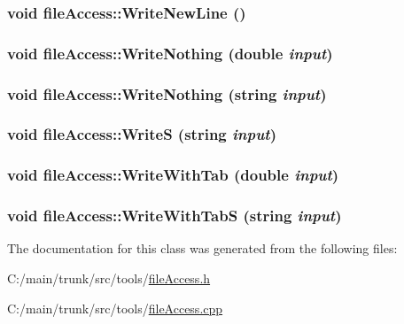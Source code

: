 \label{classfile_access_ab759f81ea15751aab3aa7ffc1bcb6162}
\hypertarget{classfile_access_a2c7465a2729dacc84a3701e997ffb320}{
\subsubsection[{WriteNewLine}]{\setlength{\rightskip}{0pt plus 5cm}void fileAccess::WriteNewLine ()}}
\label{classfile_access_a2c7465a2729dacc84a3701e997ffb320}
\hypertarget{classfile_access_ab555c3549e0c4ee285a4f4b8c8867e4c}{
\subsubsection[{WriteNothing}]{\setlength{\rightskip}{0pt plus 5cm}void fileAccess::WriteNothing (double {\em input})}}
\label{classfile_access_ab555c3549e0c4ee285a4f4b8c8867e4c}
\hypertarget{classfile_access_ac4de08bd121eadb157f295550c74dd99}{
\subsubsection[{WriteNothing}]{\setlength{\rightskip}{0pt plus 5cm}void fileAccess::WriteNothing (string {\em input})}}
\label{classfile_access_ac4de08bd121eadb157f295550c74dd99}
\hypertarget{classfile_access_a26ef28c6d48e3f4a88bd0197c6abeec0}{
\subsubsection[{WriteS}]{\setlength{\rightskip}{0pt plus 5cm}void fileAccess::WriteS (string {\em input})}}
\label{classfile_access_a26ef28c6d48e3f4a88bd0197c6abeec0}
\hypertarget{classfile_access_a833e66cca1f4d94b7f9250333d198c75}{
\subsubsection[{WriteWithTab}]{\setlength{\rightskip}{0pt plus 5cm}void fileAccess::WriteWithTab (double {\em input})}}
\label{classfile_access_a833e66cca1f4d94b7f9250333d198c75}
\hypertarget{classfile_access_a1be85b6ac39b2008402e56a4797bd76e}{
\subsubsection[{WriteWithTabS}]{\setlength{\rightskip}{0pt plus 5cm}void fileAccess::WriteWithTabS (string {\em input})}}
\label{classfile_access_a1be85b6ac39b2008402e56a4797bd76e}


The documentation for this class was generated from the following files:\begin{DoxyCompactItemize}
\item 
C:/main/trunk/src/tools/\hyperlink{file_access_8h}{fileAccess.h}\item 
C:/main/trunk/src/tools/\hyperlink{file_access_8cpp}{fileAccess.cpp}\end{DoxyCompactItemize}
